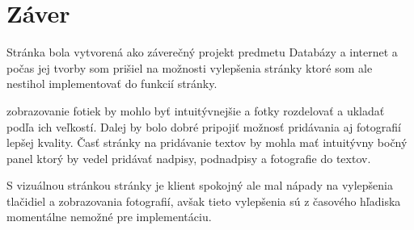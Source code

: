 \chapter{Záver}

Stránka bola vytvorená ako záverečný projekt predmetu Databázy a internet a počas jej tvorby som prišiel na možnosti vylepšenia stránky ktoré som ale nestihol implementovať do funkcií stránky.

zobrazovanie fotiek by mohlo byť intuitývnejšie a fotky rozdelovať a ukladať podľa ich veľkostí. Dalej by bolo dobré pripojiť možnosť pridávania aj fotografií lepšej kvality. Časť stránky na pridávanie textov by mohla mať intuitývny bočný panel ktorý by vedel pridávať nadpisy, podnadpisy a fotografie do textov.

S vizuálnou stránkou stránky je klient spokojný ale mal nápady na vylepšenia tlačidiel a zobrazovania fotografií, avšak tieto vylepšenia sú z časového hľadiska momentálne nemožné pre implementáciu.


